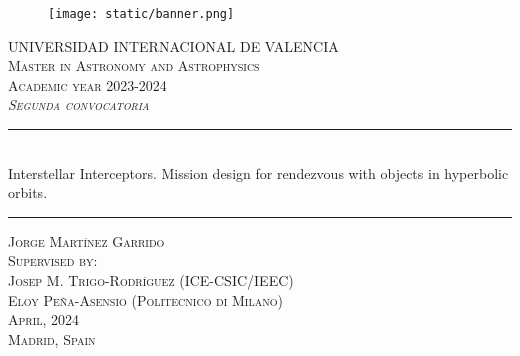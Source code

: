 \begin{titlepage}

  \begin{center}

    \begin{figure}[h]
      \centering
      \texttt{[image: static/banner.png]}
    \end{figure}
    \vspace{1cm}

    \textsc{\large
      UNIVERSIDAD INTERNACIONAL DE VALENCIA
    }\\[0.25cm]
    \textsc{\large
      Master in Astronomy and Astrophysics \\
      Academic year 2023-2024
    }\\[1cm]
    \textsc{\large
      \textit{Segunda convocatoria}
    }\\[1.25cm]

    \noindent\rule{\textwidth}{1pt}
    \\[0.25cm]
    {
    \fontsize{35pt}{35pt}\selectfont
    {
      Interstellar Interceptors. Mission design for rendezvous with objects in hyperbolic orbits.
    }
    }
    \noindent\rule{\textwidth}{1pt}

    \vspace{1.5cm}
    \textsc{\Large
      Jorge Martínez Garrido
    }\\[1.25cm]
    \textsc{\large
      Supervised by:
    }\\[0.25cm]
    \textsc{\large
      Josep M. Trigo-Rodríguez (ICE-CSIC/IEEC) \\
      Eloy Peña-Asensio (Politecnico di Milano)
    }\\[1.5cm]

    \textsc{\large
      April, 2024
    }\\[0.25cm]
    \textsc{\large
      Madrid, Spain
    }\\[0.25cm]

  \end{center}
\end{titlepage}
